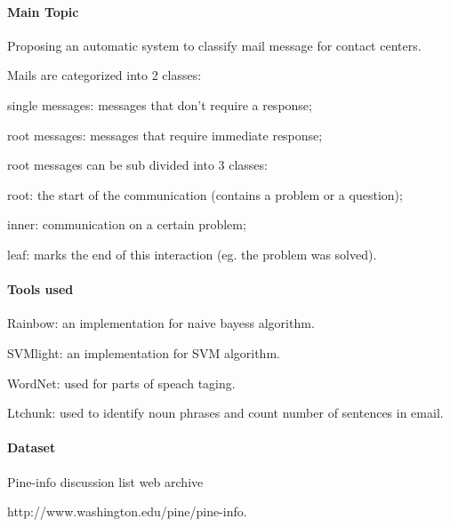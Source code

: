 \documentclass[12pt]{article}
\newenvironment{my_itemize}
{\begin{itemize}
  \setlength{\itemsep}{0cm}
  \setlength{\parskip}{0cm}}
{\end{itemize}}
\begin{document}
\paragraph{Main Topic}
\begin{my_itemize}
    \item Proposing an automatic system to classify mail message for contact centers.
    \item Mails are categorized into 2 classes:
    \begin{my_itemize}
        \item single messages: messages that don’t require a response;
        \item root messages: messages that require immediate response;
        \item root messages can be sub divided into 3 classes:
        \begin{my_itemize}
            \item root: the start of the communication (contains a problem or a question);
            \item inner: communication on a certain problem;
            \item leaf: marks the end of this interaction (eg. the problem was solved).
        \end{my_itemize}
    \end{my_itemize}
\end{my_itemize}

\paragraph{Tools used}
\begin{my_itemize}
    \item Rainbow: an implementation for naive bayess algorithm.
    \item SVMlight: an implementation for SVM algorithm.
    \item WordNet: used for parts of speach taging.
    \item Ltchunk: used to identify noun phrases and count number of sentences in email.
\end{my_itemize}

\paragraph{Dataset}
\begin{my_itemize}
    \item Pine-info discussion list web archive
    \begin{my_itemize}
        \item http://www.washington.edu/pine/pine-info.
    \end{my_itemize}
\end{my_itemize}
\end{document}
